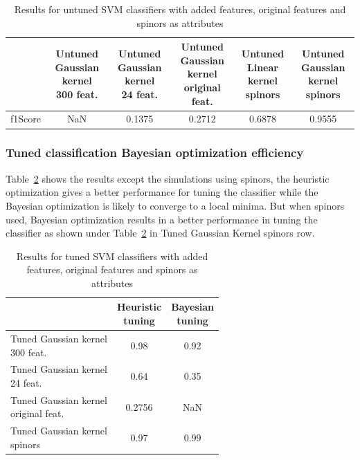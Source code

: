 \begin{table}[hbt!]
\caption{\label{tab:GaussianUntuned} Results for untuned SVM classifiers with added features, original features and spinors as attributes}
\centering
\begin{tabular}{lccccc}
\hline
& \makecell{Untuned \\ Gaussian kernel \\ 300 feat.} & \makecell{Untuned \\ Gaussian kernel \\ 24 feat.} & \makecell{Untuned \\ Gaussian kernel \\ original feat.} & \makecell{Untuned \\ Linear kernel \\ spinors}& \makecell{Untuned \\ Gaussian kernel \\ spinors }\\\hline
f1Score& NaN & 0.1375 & 0.2712 & 0.6878 & 0.9555\\
\hline
\end{tabular}
\end{table}

\subsubsection{Tuned classification Bayesian optimization efficiency}

Table~\ref{tab:GaussianTuned} shows the results except the simulations using spinors, the heuristic optimization gives a better performance for tuning the classifier while the Bayesian optimization is likely to converge to a local minima. But when spinors used, Bayesian optimization results in a better performance in tuning the classifier as shown under Table~\ref{tab:GaussianTuned} in Tuned Gaussian Kernel spinors row.  

\begin{table}[hbt!]
\caption{\label{tab:GaussianTuned} Results for tuned SVM classifiers with added features, original features and spinors as attributes}
\centering
\begin{tabular}{lcc}
\hline
& \makecell{ Heuristic\\ tuning} & \makecell{ Bayesian\\ tuning}\\\hline
 \makecell{Tuned Gaussian kernel \\ 300 feat.} & 0.98 & 0.92 \\
 \makecell{Tuned Gaussian kernel \\ 24 feat.} & 0.64 & 0.35 \\
 \makecell{Tuned Gaussian kernel \\ original feat.}  & 0.2756 & NaN\\
  \makecell{Tuned Gaussian kernel \\ spinors} & 0.97 & 0.99 \\
\hline
\end{tabular}
\end{table}


